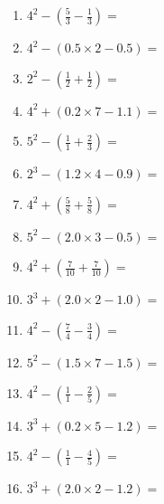 \documentclass[12pt]{article}
\begin{document}
\begin{enumerate}
\item \large $ 4^{2} - (\frac{5}{3} - \frac{1}{3}) = $ \vspace{1.6cm}
\item \large $ 4^{2} - (0.5 \times 2 - 0.5) = $ \vspace{1.6cm}
\item \large $ 2^{2} - (\frac{1}{2} + \frac{1}{2}) = $ \vspace{1.6cm}
\item \large $ 4^{2} + (0.2 \times 7 - 1.1) = $ \vspace{1.6cm}
\item \large $ 5^{2} - (\frac{1}{1} + \frac{2}{3}) = $ \vspace{1.6cm}
\item \large $ 2^{3} - (1.2 \times 4 - 0.9) = $ \vspace{1.6cm}
\newpage
\item \large $ 4^{2} + (\frac{5}{8} + \frac{5}{8}) = $ \vspace{1.6cm}
\item \large $ 5^{2} - (2.0 \times 3 - 0.5) = $ \vspace{1.6cm}
\item \large $ 4^{2} + (\frac{7}{10} + \frac{7}{10}) = $ \vspace{1.6cm}
\item \large $ 3^{3} + (2.0 \times 2 - 1.0) = $ \vspace{1.6cm}
\item \large $ 4^{2} - (\frac{7}{4} - \frac{3}{4}) = $ \vspace{1.6cm}
\item \large $ 5^{2} - (1.5 \times 7 - 1.5) = $ \vspace{1.6cm}
\item \large $ 4^{2} - (\frac{1}{1} - \frac{2}{5}) = $ \vspace{1.6cm}
\item \large $ 3^{3} + (0.2 \times 5 - 1.2) = $ \vspace{1.6cm}
\item \large $ 4^{2} - (\frac{1}{1} - \frac{4}{5}) = $ \vspace{1.6cm}
\item \large $ 3^{3} + (2.0 \times 2 - 1.2) = $ \vspace{1.6cm}
\end{enumerate}\newpage
\end{document}
